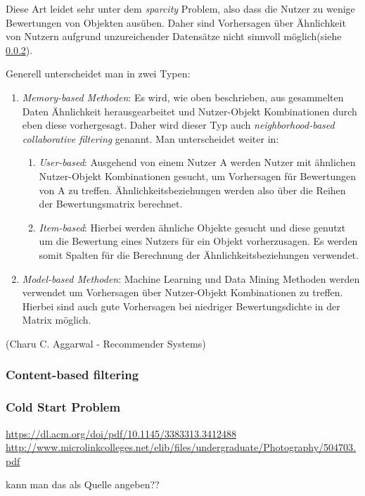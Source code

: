 Diese Art leidet sehr unter dem \textit{sparcity} Problem, also dass die Nutzer zu wenige Bewertungen von Objekten ausüben. Daher sind Vorhersagen über Ähnlichkeit von Nutzern aufgrund unzureichender Datensätze nicht sinnvoll möglich(siehe \ref{Cold Start Problem}).

Generell unterscheidet man in zwei Typen:

\begin{enumerate}		
	\item \textit{Memory-based Methoden}: Es wird, wie oben beschrieben, aus gesammelten Daten Ähnlichkeit herausgearbeitet und Nutzer-Objekt Kombinationen durch eben diese vorhergesagt. Daher wird dieser Typ auch \textit{neighborhood-based collaborative filtering} genannt. Man unterscheidet weiter in:
	\begin{enumerate}
		\item \textit{User-based}: Ausgehend von einem Nutzer A werden Nutzer mit ähnlichen Nutzer-Objekt Kombinationen gesucht, um Vorhersagen für Bewertungen von A zu treffen. Ähnlichkeitsbeziehungen werden also über die Reihen der Bewertungsmatrix berechnet.
		\item \textit{Item-based}: Hierbei werden ähnliche Objekte gesucht und diese genutzt um die Bewertung eines Nutzers für ein Objekt vorherzusagen. Es werden somit Spalten für die Berechnung der Ähnlichkeitsbeziehungen verwendet.
	\end{enumerate}
	\item \textit{Model-based Methoden}: Machine Learning und Data Mining Methoden werden verwendet um Vorhersagen über Nutzer-Objekt Kombinationen zu treffen. Hierbei sind auch gute Vorhersagen bei niedriger Bewertungsdichte in der Matrix möglich.
\end{enumerate}
(Charu C. Aggarwal - Recommender Systems)



\subsubsection{Content-based filtering}
\subsubsection{Cold Start Problem}
\label{Cold Start Problem}

\url{https://dl.acm.org/doi/pdf/10.1145/3383313.3412488}
\url{http://www.microlinkcolleges.net/elib/files/undergraduate/Photography/504703.pdf}

kann man das als Quelle angeben??